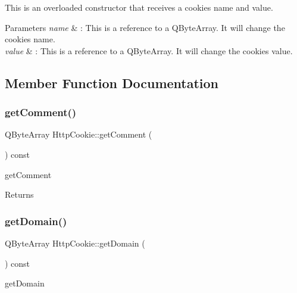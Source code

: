 This is an overloaded constructor that receives a cookie\textquotesingle{}s name and value. 


\begin{DoxyParams}{Parameters}
{\em name} & \+: This is a reference to a Q\+Byte\+Array. It will change the cookie\textquotesingle{}s name. \\
\hline
{\em value} & \+: This is a reference to a Q\+Byte\+Array. It will change the cookie\textquotesingle{}s value. \\
\hline
\end{DoxyParams}


\subsection{Member Function Documentation}
\mbox{\label{class_http_cookie_ad48e447c1d4dfbed9e81713016ca0531}} 
\subsubsection{\texorpdfstring{get\+Comment()}{getComment()}}
{\footnotesize\ttfamily Q\+Byte\+Array Http\+Cookie\+::get\+Comment (\begin{DoxyParamCaption}{ }\end{DoxyParamCaption}) const}



get\+Comment 

\begin{DoxyReturn}{Returns}

\end{DoxyReturn}
\mbox{\label{class_http_cookie_aeaafc0d8651b07c94d1ed247a4e23dff}} 
\subsubsection{\texorpdfstring{get\+Domain()}{getDomain()}}
{\footnotesize\ttfamily Q\+Byte\+Array Http\+Cookie\+::get\+Domain (\begin{DoxyParamCaption}{ }\end{DoxyParamCaption}) const}



get\+Domain 

